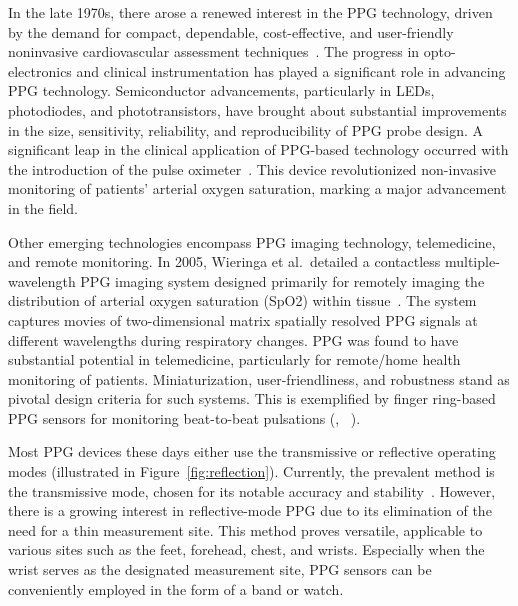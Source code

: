 In the late 1970s, there arose a renewed interest in the PPG technology, driven by the demand for compact, dependable, cost-effective, and user-friendly noninvasive cardiovascular assessment techniques~\cite{yoshiyaSpectrophotometricMonitoringArterial1980}.
The progress in opto-electronics and clinical instrumentation has played a significant role in advancing PPG technology.
Semiconductor advancements, particularly in LEDs, photodiodes, and phototransistors, have brought about substantial improvements in the size, sensitivity, reliability, and reproducibility of PPG probe design.
A significant leap in the clinical application of PPG-based technology occurred with the introduction of the pulse oximeter~\cite{aoyagiPulseOximetryIts2002}.
This device revolutionized non-invasive monitoring of patients' arterial oxygen saturation, marking a major advancement in the field.

Other emerging technologies encompass PPG imaging technology, telemedicine, and remote monitoring.
In 2005, Wieringa et al.\ detailed a contactless multiple-wavelength PPG imaging system designed primarily for remotely imaging the distribution of arterial oxygen saturation (SpO2) within tissue~\cite{wieringaContactlessMultipleWavelength2005}.
The system captures movies of two-dimensional matrix spatially resolved PPG signals at different wavelengths during respiratory changes.
PPG was found to have substantial potential in telemedicine, particularly for remote/home health monitoring of patients.
Miniaturization, user-friendliness, and robustness stand as pivotal design criteria for such systems.
This is exemplified by finger ring-based PPG sensors for monitoring beat-to-beat pulsations (\cite{rheeArtifactresistantPowerefficientDesign2001}, ~\cite{zhengRingtypeDeviceNoninvasive2003}).

Most PPG devices these days either use the transmissive or reflective operating modes (illustrated in Figure~\ref{fig:reflection}).
Currently, the prevalent method is the transmissive mode, chosen for its notable accuracy and stability~\cite{leeReflectancePulseOximetry2016}.
However, there is a growing interest in reflective-mode PPG due to its elimination of the need for a thin measurement site.
This method proves versatile, applicable to various sites such as the feet, forehead, chest, and wrists.
Especially when the wrist serves as the designated measurement site, PPG sensors can be conveniently employed in the form of a band or watch.

